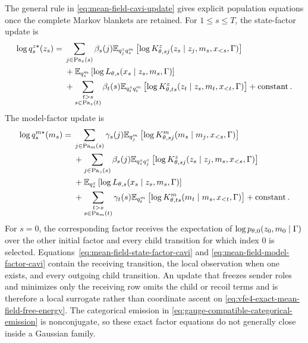 The general rule in \cref{eq:mean-field-cavi-update} gives explicit population equations once the complete Markov blankets are retained. For $1\leq s\leq T$, the state-factor update is
\begin{equation}
\begin{aligned}
\log q_s^{z\star}(z_s)
={}&\sum_{j\in\operatorname{Pa}_z(s)}\beta_s(j)
\mathbb E_{q_j^zq_s^m}
\left[
\log K^z_{\theta,sj}(z_s\mid z_j,m_s,x_{<s},\Gamma)
\right]\\
&+\mathbb E_{q_s^m}
\left[
\log L_{\theta,s}(x_s\mid z_s,m_s,\Gamma)
\right]\\
&+\sum_{\substack{t>s\\s\in\operatorname{Pa}_z(t)}}
\beta_t(s)\mathbb E_{q_t^zq_t^m}
\left[
\log K^z_{\theta,ts}(z_t\mid z_s,m_t,x_{<t},\Gamma)
\right]
+\operatorname{constant}.
\end{aligned}
\label{eq:mean-field-state-factor-cavi}
\end{equation}
The model-factor update is
\begin{equation}
\begin{aligned}
\log q_s^{m\star}(m_s)
={}&\sum_{j\in\operatorname{Pa}_m(s)}\gamma_s(j)
\mathbb E_{q_j^m}
\left[
\log K^m_{\theta,sj}(m_s\mid m_j,x_{<s},\Gamma)
\right]\\
&+\sum_{j\in\operatorname{Pa}_z(s)}\beta_s(j)
\mathbb E_{q_s^zq_j^z}
\left[
\log K^z_{\theta,sj}(z_s\mid z_j,m_s,x_{<s},\Gamma)
\right]\\
&+\mathbb E_{q_s^z}
\left[
\log L_{\theta,s}(x_s\mid z_s,m_s,\Gamma)
\right]\\
&+\sum_{\substack{t>s\\s\in\operatorname{Pa}_m(t)}}
\gamma_t(s)\mathbb E_{q_t^m}
\left[
\log K^m_{\theta,ts}(m_t\mid m_s,x_{<t},\Gamma)
\right]
+\operatorname{constant}.
\end{aligned}
\label{eq:mean-field-model-factor-cavi}
\end{equation}
For $s=0$, the corresponding factor receives the expectation of $\log p_{\theta,0}(z_0,m_0\mid\Gamma)$ over the other initial factor and every child transition for which index $0$ is selected. Equations~\eqref{eq:mean-field-state-factor-cavi} and \eqref{eq:mean-field-model-factor-cavi} contain the receiving transition, the local observation when one exists, and every outgoing child transition. An update that freezes sender roles and minimizes only the receiving row omits the child or recoil terms and is therefore a local surrogate rather than coordinate ascent on \cref{eq:vfe4-exact-mean-field-free-energy}. The categorical emission in \cref{eq:gauge-compatible-categorical-emission} is nonconjugate, so these exact factor equations do not generally close inside a Gaussian family.

